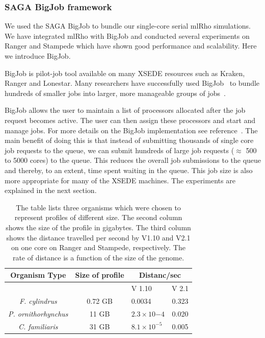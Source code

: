 \documentclass{sig-alternate}
\begin{document}
\subsubsection{SAGA BigJob framework}
\label{sec:bigjob}

We used the SAGA BigJob to bundle our single-core serial mlRho simulations. We have integrated mlRho with BigJob and conducted several experiments on Ranger and Stampede which have shown good performance and scalability. Here we introduce BigJob.

BigJob is pilot-job tool available on many XSEDE resources such as Kraken, Ranger and Lonestar. Many researchers have successfully used BigJob~\cite{bigjob_web} to bundle hundreds of smaller jobs into larger, more manageable groups of jobs~\cite{Luckow:2008fp, async_repex11}. 

BigJob allows the user to maintain a list of processors allocated after the job request becomes active. The user can then assign these processors and start and manage jobs. For more details on the BigJob implementation see reference~\cite{saga_bigjob_condor_cloud}. The main benefit of doing this is that instead of submitting thousands of single core job requests to the queue, we can submit hundreds of large job requests ($\approx$ 500 to 5000 cores) to the queue. This reduces the overall job submissions to the queue and thereby, to an extent, time spent waiting in the queue. This job size is also more appropriate for many of the XSEDE machines. The experiments are explained in the next section. 

\begin{table}
\centering
\begin{tabular}{|c|c| p{1.3cm} |c  |     } \hline
Organism Type		& Size of profile& \multicolumn{2}{|c|}{Distanc/sec}  \\ \hline
	&   & V 1.10 & V 2.1 \\ \hline
{\it F. cylindrus}  & 0.72 GB & 0.0034 & 0.323 \\ \hline
{\it P. ornithorhynchus}  & 11 GB &$2.3{\times}10{-4}$ & 0.020 \\ \hline
{\it C. familiaris}  & 31 GB & $8.1{\times}10^{-5}$ & 0.005 \\
\hline

\end{tabular}
\caption{The table lists three organisms which were chosen to represent profiles of different size. The second column shows the size of the profile in gigabytes. The third column shows the distance travelled per second by V1.10 and V2.1 on one core on Ranger and Stampede, respectively. The rate of distance is a function of the size of the genome.  } 
\label{table:cache_comp}
\end{table}
\end{document}
